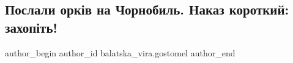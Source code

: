  
 
 
 
 
 
\subsection{Послали орків на Чорнобиль. Наказ короткий: захопіть!}
\label{sec:30_03_2022.fb.balatska_vira.gostomel.1.orki_chernobyl}
 
\ifcmt
 author_begin
   author_id balatska_vira.gostomel
 author_end
\fi



